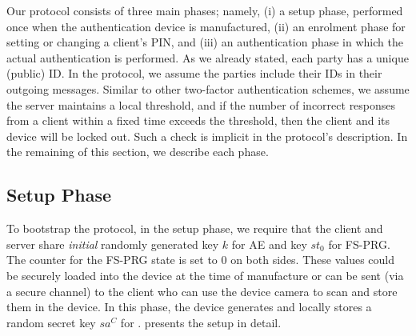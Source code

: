 \documentclass[runningheads]{llncs}
\newcommand{\sss}{\scriptscriptstyle}
\newcommand{\salt}{\ensuremath{{sa}}}
\renewcommand{\state}{\ensuremath{{st}}}
\newcommand{\VC}[1]{\ensuremath{#1^{\sss C}}}
\begin{document}
Our protocol consists of three main phases; namely, (i) a setup phase, performed once when the authentication device is manufactured, (ii) an enrolment phase for setting or changing a client's PIN, and (iii) an authentication phase in which the actual authentication is performed. As we already stated, each party has a unique (public) ID. In the protocol, we assume the parties include their IDs in their outgoing messages.  Similar to other two-factor authentication schemes, we assume the server maintains a local threshold, and if the number of incorrect responses from a client within a fixed time exceeds the threshold, then the client and its device will be locked out. Such a check is implicit in the protocol's description. In the remaining of this section, we describe each phase. 

\subsection{Setup Phase}
\label{sec:setup}

To bootstrap the protocol, in the setup phase, we require that the client
and server share \emph{initial} randomly generated key $k$ for AE and key $\state_{\sss 0}$ for  FS-PRG.
The counter for the FS-PRG state is set to $0$ on both sides. 
These values could be securely loaded into the device at the time of
manufacture or can be sent (via a secure channel) to the client who can use the device camera to scan and store them in the device. In this phase, the device generates and locally stores a random secret key $\VC{\salt}$ for \prf.   presents the setup in detail. 
\end{document}
